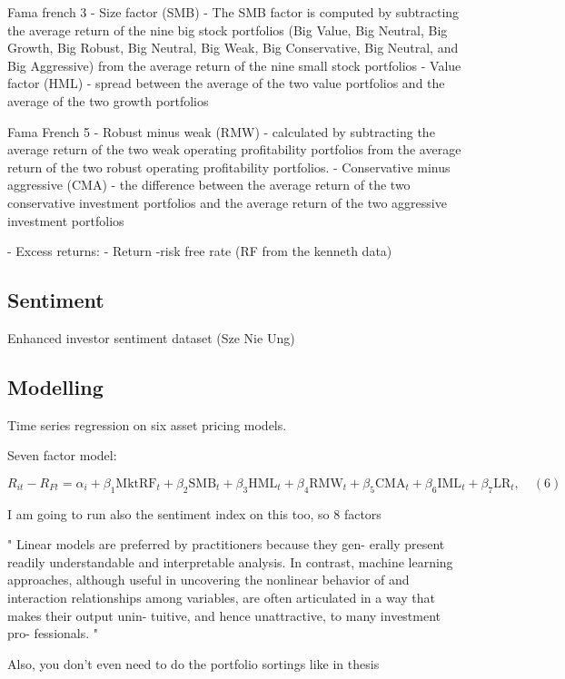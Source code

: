 Fama french 3
- Size factor (SMB)
    - The SMB factor is computed by subtracting the average return of the nine big stock portfolios
    (Big Value, Big Neutral, Big Growth, Big Robust, Big Neutral, Big Weak, Big Conservative,
    Big Neutral, and Big Aggressive) from the average return of the nine small stock portfolios
- Value factor (HML)
    -  spread between the average of the two value portfolios and the average of the two growth portfolios

Fama French 5
- Robust minus weak (RMW)
    - calculated by subtracting the average return of the two
    weak operating profitability portfolios from the average return of the two robust operating
    profitability portfolios.
- Conservative minus aggressive (CMA)
    - the difference between the average return of
    the two conservative investment portfolios and the average return of the two aggressive
    investment portfolios 

- Excess returns:
    - Return -risk free rate (RF from the kenneth data)

\subsection{Sentiment}
Enhanced investor sentiment dataset (Sze Nie Ung)


\subsection{Modelling}

Time series regression on six asset pricing models.

Seven factor model:

\[
R_{it} - R_{Ft} = \alpha_i + \beta_1 \text{MktRF}_t + \beta_2 \text{SMB}_t + \beta_3 \text{HML}_t + \beta_4 \text{RMW}_t + \beta_5 \text{CMA}_t + \beta_6 \text{IML}_t + \beta_7 \text{LR}_t, \quad (6)
\]

I am going to run also the sentiment index on this too, so 8 factors

" Linear
models are preferred by practitioners because they gen-
erally present readily understandable and interpretable
analysis. In contrast, machine learning approaches,
although useful in uncovering the nonlinear behavior
of and interaction relationships among variables, are
often articulated in a way that makes their output unin-
tuitive, and hence unattractive, to many investment pro-
fessionals. "

Also, you don't even need to do the portfolio sortings like in thesis

